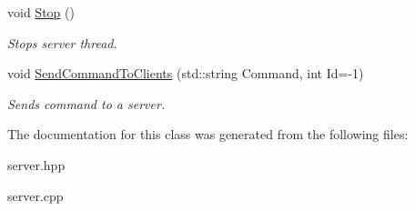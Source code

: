 \begin{DoxyCompactItemize}
\mbox{\label{classtfp_1_1_network_server_ae471e474cb57201defdafa99e4a5a538}} 
void \mbox{\hyperlink{classtfp_1_1_network_server_ae471e474cb57201defdafa99e4a5a538}{Stop}} ()
\begin{DoxyCompactList}\small\item\em Stops server thread. \end{DoxyCompactList}\item 
\mbox{\label{classtfp_1_1_network_server_aa102c86afba78c1b27d3c68af7dd6d16}} 
void \mbox{\hyperlink{classtfp_1_1_network_server_aa102c86afba78c1b27d3c68af7dd6d16}{Send\+Command\+To\+Clients}} (std\+::string Command, int Id=-\/1)
\begin{DoxyCompactList}\small\item\em Sends command to a server. \end{DoxyCompactList}\end{DoxyCompactItemize}


The documentation for this class was generated from the following files\+:\begin{DoxyCompactItemize}
\item 
server.\+hpp\item 
server.\+cpp\end{DoxyCompactItemize}
